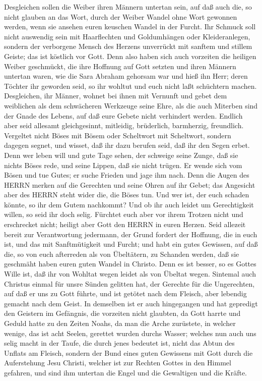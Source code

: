  Desgleichen sollen die Weiber ihren Männern untertan sein,
auf daß auch die, so nicht glauben an das Wort, durch der Weiber Wandel
ohne Wort gewonnen werden,  wenn sie ansehen euren keuschen
Wandel in der Furcht.  Ihr Schmuck soll nicht auswendig sein
mit Haarflechten und Goldumhängen oder Kleideranlegen, 
sondern der verborgene Mensch des Herzens unverrückt mit sanftem und
stillem Geiste; das ist köstlich vor Gott.  Denn also haben
sich auch vorzeiten die heiligen Weiber geschmückt, die ihre Hoffnung
auf Gott setzten und ihren Männern untertan waren,  wie die
Sara Abraham gehorsam war und hieß ihn Herr; deren Töchter ihr geworden
seid, so ihr wohltut und euch nicht laßt schüchtern machen. 
Desgleichen, ihr Männer, wohnet bei ihnen mit Vernunft und gebet dem
weiblichen als dem schwächeren Werkzeuge seine Ehre, als die auch
Miterben sind der Gnade des Lebens, auf daß eure Gebete nicht verhindert
werden.  Endlich aber seid allesamt gleichgesinnt,
mitleidig, brüderlich, barmherzig, freundlich.  Vergeltet
nicht Böses mit Bösem oder Scheltwort mit Scheltwort, sondern dagegen
segnet, und wisset, daß ihr dazu berufen seid, daß ihr den Segen erbet.
 Denn wer leben will und gute Tage sehen, der schweige
seine Zunge, daß sie nichts Böses rede, und seine Lippen, daß sie nicht
trügen.  Er wende sich vom Bösen und tue Gutes; er suche
Frieden und jage ihm nach.  Denn die Augen des HERRN merken
auf die Gerechten und seine Ohren auf ihr Gebet; das Angesicht aber des
HERRN steht wider die, die Böses tun.  Und wer ist, der
euch schaden könnte, so ihr dem Gutem nachkommt?  Und ob
ihr auch leidet um Gerechtigkeit willen, so seid ihr doch selig.
Fürchtet euch aber vor ihrem Trotzen nicht und erschrecket nicht;
 heiligt aber Gott den HERRN in euren Herzen. Seid allezeit
bereit zur Verantwortung jedermann, der Grund fordert der Hoffnung, die
in euch ist,  und das mit Sanftmütigkeit und Furcht; und
habt ein gutes Gewissen, auf daß die, so von euch afterreden als von
Übeltätern, zu Schanden werden, daß sie geschmäht haben euren guten
Wandel in Christo.  Denn es ist besser, so es Gottes Wille
ist, daß ihr von Wohltat wegen leidet als von Übeltat wegen.
 Sintemal auch Christus einmal für unsre Sünden gelitten
hat, der Gerechte für die Ungerechten, auf daß er uns zu Gott führte,
und ist getötet nach dem Fleisch, aber lebendig gemacht nach dem Geist.
 In demselben ist er auch hingegangen und hat gepredigt den
Geistern im Gefängnis,  die vorzeiten nicht glaubten, da
Gott harrte und Geduld hatte zu den Zeiten Noahs, da man die Arche
zurüstete, in welcher wenige, das ist acht Seelen, gerettet wurden
durchs Wasser;  welches nun auch uns selig macht in der
Taufe, die durch jenes bedeutet ist, nicht das Abtun des Unflats am
Fleisch, sondern der Bund eines guten Gewissens mit Gott durch die
Auferstehung Jesu Christi,  welcher ist zur Rechten Gottes
in den Himmel gefahren, und sind ihm untertan die Engel und die
Gewaltigen und die Kräfte.

